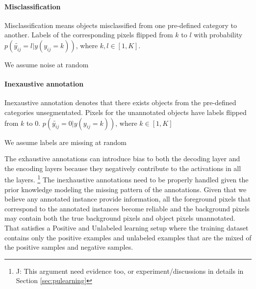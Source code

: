 \noindent
\paragraph{Misclassification}
Misclassification means objects misclassified from one pre-defined category to another.
Labels of the corresponding pixels flipped from $k$ to $l$ with probability $p(\tilde{y_{ij}}=l\vert y(y_{ij}=k))$, where $k,l \in [1, K]$.

We assume noise at random

\noindent
\paragraph{Inexaustive annotation}
Inexaustive annotation denotes that there exists objects from the pre-defined categories unsegmentated.
Pixels for the unannotated objects have labels flipped from $k$ to $0$.
$p(\tilde{y_{ij}}=0\vert y(y_{ij}=k))$, where $k \in [1,K]$

We assume labels are missing at random

\noindent
The exhaustive annotations can introduce bias to both the decoding layer and the encoding layers because they negatively contribute to the activations in all the layers.
\footnote{J: This argument need evidence too, or experiment/discussions in details in Section \ref{sec:pulearning}}
The inexhaustive annotations need to be properly handled given the prior knowledge modeling the missing pattern of the annotations.
Given that we believe any annotated instance provide information, all the foreground pixels that correspond to the annotated instances become reliable and the background pixels may contain both the true background pixels and object pixels unannotated.
That satisfies a Positive and Unlabeled learning setup where the training dataset contains only the positive examples and unlabeled examples that are the mixed of the positive samples and negative samples.


